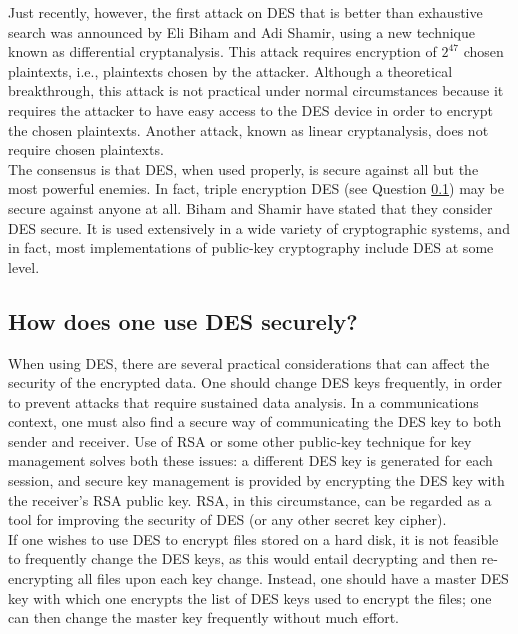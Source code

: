 Just recently, however, the first attack on DES that is better than
exhaustive search was announced by Eli Biham and Adi Shamir, using a
new technique known as differential cryptanalysis. This attack requires
encryption of $2^{47}$ chosen plaintexts, i.e., plaintexts chosen by the
attacker. Although a theoretical breakthrough, this attack is not
practical under normal circumstances because it requires the attacker
to have easy access to the DES device in order to encrypt the chosen
plaintexts. Another attack, known as linear cryptanalysis, does not
require chosen plaintexts.\\

The consensus is that DES, when used properly, is secure against all but
the most powerful enemies. In fact, triple encryption DES (see Question
\ref{how_des_sec}) may be secure against anyone at all. Biham and Shamir
have stated that they consider DES secure. It is used extensively in a wide
variety of cryptographic systems, and in fact, most implementations of
public-key cryptography include DES at some level.

\subsection{How does one use DES securely?}
\label{how_des_sec}

When using DES, there are several practical considerations that can
affect the security of the encrypted data. One should change DES keys
frequently, in order to prevent attacks that require sustained data
analysis. In a communications context, one must also find a secure way
of communicating the DES key to both sender and receiver. Use of RSA or
some other public-key technique for key management solves both these
issues: a different DES key is generated for each session, and secure
key management is provided by encrypting the DES key with the
receiver's RSA public key. RSA, in this circumstance, can be regarded
as a tool for improving the security of DES (or any other secret key
cipher).\\

If one wishes to use DES to encrypt files stored on a hard disk, it is
not feasible to frequently change the DES keys, as this would entail
decrypting and then re-encrypting all files upon each key change.
Instead, one should have a master DES key with which one encrypts the
list of DES keys used to encrypt the files; one can then change the
master key frequently without much effort.\\


